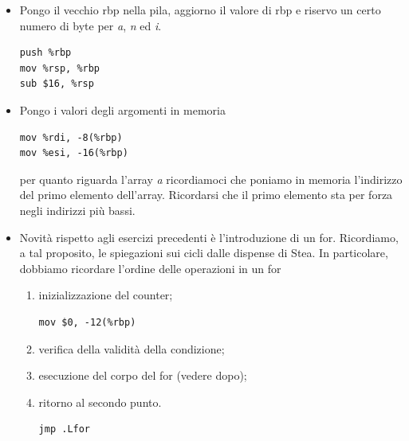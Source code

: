 \documentclass[11pt]{report}
\theoremstyle{definition}
\begin{document}
\begin{itemize}
\item Pongo il vecchio rbp nella pila, aggiorno il valore di rbp e riservo un certo numero di byte per \emph{a}, \emph{n} ed \emph{i}.
\begin{verbatim}
push %rbp
mov %rsp, %rbp
sub $16, %rsp
\end{verbatim}
\item Pongo i valori degli argomenti in memoria
\begin{verbatim}
mov %rdi, -8(%rbp)
mov %esi, -16(%rbp)
\end{verbatim}
per quanto riguarda l'array \emph{a} ricordiamoci che poniamo in memoria l'indirizzo del primo elemento dell'array. Ricordarsi che il primo elemento sta per forza negli indirizzi più bassi.
\item Novità rispetto agli esercizi precedenti è l'introduzione di un for. Ricordiamo, a tal proposito, le spiegazioni sui cicli dalle dispense di Stea. In particolare, dobbiamo ricordare l'ordine delle operazioni in un for
\begin{enumerate}
\item inizializzazione del counter;
\begin{verbatim}
mov $0, -12(%rbp)
\end{verbatim}
\item verifica della validità della condizione;
\item esecuzione del corpo del for (vedere dopo);
\item ritorno al secondo punto.
\begin{verbatim}
jmp .Lfor
\end{verbatim}
\end{enumerate}
\end{itemize}
\end{document}
